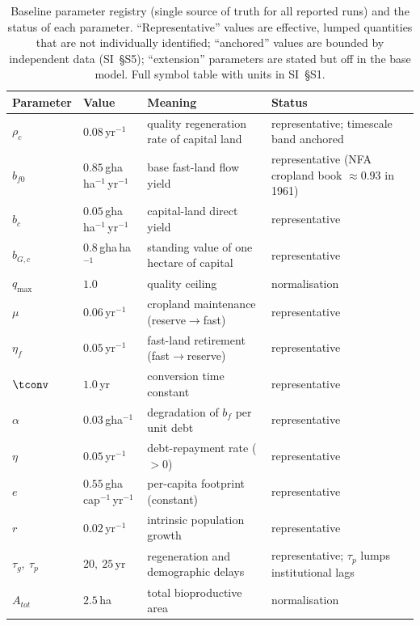 \begin{table}[!htbp]
\centering\footnotesize
\caption{Baseline parameter registry (single source of truth for all reported runs) and the status of each parameter. ``Representative'' values are effective, lumped quantities that are not individually identified; ``anchored'' values are bounded by independent data (SI~\S S5); ``extension'' parameters are stated but off in the base model. Full symbol table with units in SI~\S S1.}
\label{tab:params}
\setlength{\tabcolsep}{4pt}
\begin{tabularx}{\textwidth}{@{}>{\raggedright\arraybackslash}p{} >{\raggedright\arraybackslash}p{} >{\raggedright\arraybackslash}X >{\raggedright\arraybackslash}p{}@{}}
\toprule
Parameter & Value & Meaning & Status \\
\midrule
$\rho_c$ & $0.08$\,yr$^{-1}$ & quality regeneration rate of capital land & representative; timescale band anchored \\
$b_{f0}$ & $0.85$\,gha\,ha$^{-1}$\,yr$^{-1}$ & base fast-land flow yield & representative (NFA cropland book $\approx0.93$ in 1961) \\
$b_c$ & $0.05$\,gha\,ha$^{-1}$\,yr$^{-1}$ & capital-land direct yield & representative \\
$b_{G,c}$ & $0.8$\,gha\,ha$^{-1}$ & standing value of one hectare of capital & representative \\
$q_{\max}$ & $1.0$ & quality ceiling & normalisation \\
$\mu$ & $0.06$\,yr$^{-1}$ & cropland maintenance (reserve$\to$fast) & representative \\
$\eta_f$ & $0.05$\,yr$^{-1}$ & fast-land retirement (fast$\to$reserve) & representative \\
$\tconv$ & $1.0$\,yr & conversion time constant & representative \\
$\alpha$ & $0.03$\,gha$^{-1}$ & degradation of $b_f$ per unit debt & representative \\
$\eta$ & $0.05$\,yr$^{-1}$ & debt-repayment rate ($>0$) & representative \\
$e$ & $0.55$\,gha\,cap$^{-1}$\,yr$^{-1}$ & per-capita footprint (constant) & representative \\
$r$ & $0.02$\,yr$^{-1}$ & intrinsic population growth & representative \\
$\tau_g,\ \tau_p$ & $20,\ 25$\,yr & regeneration and demographic delays & representative; $\tau_p$ lumps institutional lags \\
$A_{tot}$ & $2.5$\,ha & total bioproductive area & normalisation \\

\end{tabularx}
\end{table}
